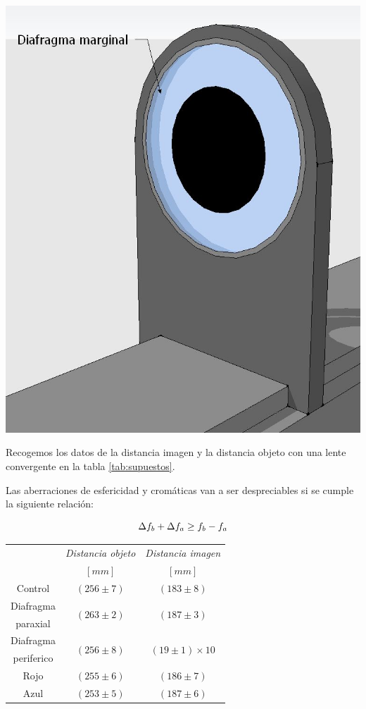\documentclass[a4paper,12pt]{article}
\newenvironment{Figure}
  {\par\medskip\noindent\minipage{\linewidth}}
  {\endminipage\par\medskip}
\begin{document}
\begin{multicols*}{2}
        \begin{Figure}
            \centering
            \includegraphics[width=0.7\linewidth]{Diafragma marginal.JPG}
            \label{f: Dmarg}
        \end{Figure}

        Recogemos los datos de la distancia imagen y la distancia objeto con una lente convergente en la tabla \ref{tab:supuestos}.

        Las aberraciones de esfericidad y cromáticas van a ser despreciables si se cumple la siguiente relación:

        \begin{equation}
            \centering
            \Delta f_{b} + \Delta f_{a} \geq f_{b} - f_{a}
        \end{equation}
 
        \begin{Figure}
            \centering

            \begin{tabular}{c|c c}
                \toprule
                 & \textit{Distancia objeto} & \textit{Distancia imagen}\\
                 & \textit{$[mm]$} & \textit{$[mm]$}\\
                \midrule
                Control & $(256 \pm 7)$ &$(183 \pm 8)$\\ \hline
                Diafragma & \multirow{2}{*}{$(263 \pm 2)$} & \multirow{2}{*}{$(187 \pm 3)$}\\
                paraxial & & \\
                Diafragma & \multirow{2}{*}{$(256 \pm 8)$} & \multirow{2}{*}{$(19 \pm 1)\times 10$}\\
                periferico & & \\ \hline
                Rojo & $(255 \pm 6)$ &$(186 \pm 7)$\\
                Azul & $(253 \pm 5)$ &$(187 \pm 6)$\\ 
                \bottomrule
            \end{tabular}


\end{Figure}
\end{multicols*}
\end{document}
